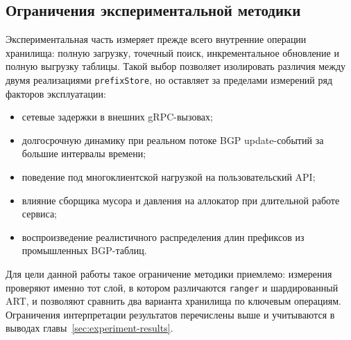 \subsection{Ограничения экспериментальной методики}

Экспериментальная часть измеряет прежде всего внутренние операции
хранилища: полную загрузку, точечный поиск, инкрементальное обновление и
полную выгрузку таблицы. Такой выбор позволяет изолировать различия между
двумя реализациями \texttt{prefixStore}, но оставляет за пределами
измерений ряд факторов эксплуатации:

\begin{itemize}
\item сетевые задержки в внешних gRPC-вызовах;
\item долгосрочную динамику при реальном потоке BGP update-событий за
большие интервалы времени;
\item поведение под многоклиентской нагрузкой на пользовательский API;
\item влияние сборщика мусора и давления на аллокатор при длительной
работе сервиса;
\item воспроизведение реалистичного распределения длин префиксов из
промышленных BGP-таблиц.
\end{itemize}

Для цели данной работы такое ограничение методики приемлемо: измерения
проверяют именно тот слой, в котором различаются \texttt{ranger} и
шардированный ART, и позволяют сравнить два варианта хранилища по
ключевым операциям.
Ограничения интерпретации результатов перечислены выше и учитываются в
выводах главы~\ref{sec:experiment-results}.

